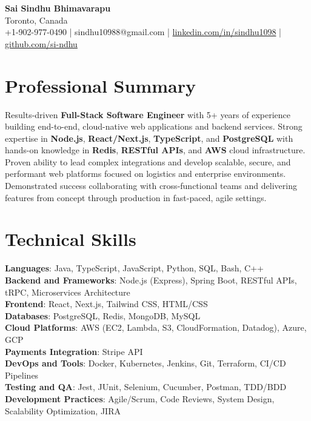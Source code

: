 \documentclass[letterpaper,11pt]{article}
\begin{document}
\begin{center}
  {\Large \textbf{Sai Sindhu Bhimavarapu}} \\
  Toronto, Canada \\
  +1-902-977-0490 \enspace | \enspace sindhu10988@gmail.com \enspace | \enspace \href{https://www.linkedin.com/in/sindhu1098/}{linkedin.com/in/sindhu1098} \enspace | \enspace \href{https://github.com/si-ndhu}{github.com/si-ndhu}
\end{center}

\section{Professional Summary}
  \begin{itemize}[leftmargin=0.15in, label={}]
    \small{\item{
     Results-driven \textbf{Full-Stack Software Engineer} with 5+ years of experience building end-to-end, cloud-native web applications and backend services. Strong expertise in \textbf{Node.js}, \textbf{React/Next.js}, \textbf{TypeScript}, and \textbf{PostgreSQL} with hands-on knowledge in \textbf{Redis}, \textbf{RESTful APIs}, and \textbf{AWS} cloud infrastructure. Proven ability to lead complex integrations and develop scalable, secure, and performant web platforms focused on logistics and enterprise environments. Demonstrated success collaborating with cross-functional teams and delivering features from concept through production in fast-paced, agile settings.
    }}
  \end{itemize}
\vspace{-16pt}

\section{Technical Skills}
 \begin{itemize}[leftmargin=0.15in, label={}]
    \small{\item{
     \textbf{Languages}: Java, TypeScript, JavaScript, Python, SQL, Bash, C++ \\
     \textbf{Backend and Frameworks}: Node.js (Express), Spring Boot, RESTful APIs, tRPC, Microservices Architecture \\
     \textbf{Frontend}: React, Next.js, Tailwind CSS, HTML/CSS \\
     \textbf{Databases}: PostgreSQL, Redis, MongoDB, MySQL \\
     \textbf{Cloud Platforms}: AWS (EC2, Lambda, S3, CloudFormation, Datadog), Azure, GCP \\
     \textbf{Payments Integration}: Stripe API \\
     \textbf{DevOps and Tools}: Docker, Kubernetes, Jenkins, Git, Terraform, CI/CD Pipelines \\
     \textbf{Testing and QA}: Jest, JUnit, Selenium, Cucumber, Postman, TDD/BDD \\
     \textbf{Development Practices}: Agile/Scrum, Code Reviews, System Design, Scalability Optimization, JIRA
    }}
 \end{itemize}
\vspace{-16pt}
\end{document}
